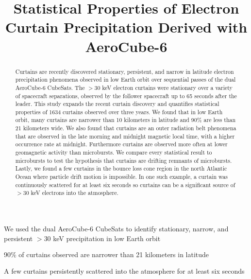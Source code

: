 \documentclass[draft]{agujournal2019}
\begin{document}
\title{Statistical Properties of Electron Curtain Precipitation Derived with AeroCube-6}

%
%






\begin{keypoints}
\item We used the dual AeroCube-6 CubeSats to identify stationary, narrow, and persistent $>30$ keV precipitation in low Earth orbit
\item 90\% of curtains observed are narrower than 21 kilometers in latitude
\item A few curtains persistently scattered into the atmosphere for at least six seconds
\end{keypoints}


\begin{abstract}
Curtains are recently discovered stationary, persistent, and narrow in latitude electron precipitation phenomena observed in low Earth orbit over sequential passes of the dual AeroCube-6 CubeSats. The $> 30$ keV electron curtains were stationary over a variety of spacecraft separations, observed by the follower spacecraft up to 65 seconds after the leader. This study expands the recent curtain discovery and quantifies statistical properties of 1634 curtains observed over three years. We found that in low Earth orbit, many curtains are narrower than 10 kilometers in latitude and 90\% are less than 21 kilometers wide. We also found that curtains are an outer radiation belt phenomena that are observed in the late morning and midnight magnetic local time, with a higher occurrence rate at midnight. Furthermore curtains are observed more often at lower geomagnetic activity than microbursts.  We compare every statistical result to microbursts to test the hypothesis that curtains are drifting remnants of microbursts. Lastly, we found a few curtains in the bounce loss cone region in the north Atlantic Ocean where particle drift motion is impossible. In one such example, a curtain was continuously scattered for at least six seconds so curtains can be a significant source of $> 30$ keV electrons into the atmosphere.
\end{abstract}
\end{document}
